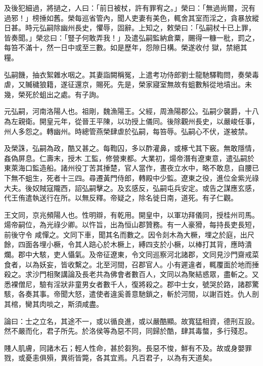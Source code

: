 \begin{pinyinscope}
 及後犯細過，將撾之，人曰：「前日被杖，許有罪宥之。」榮曰：「無過尚爾，況有過邪！」榜捶如舊。榮每巡省管內，聞人吏妻有美色，輒舍其室而淫之，貪暴放縱日甚。時元弘嗣除幽州長史，懼辱，固辭。上知之，敕榮曰：「弘嗣杖十已上罪，皆奏聞。」榮忿曰：「豎子何敢弄我！」及遣弘嗣監納倉粟，颺得一糠一秕，罰之，每笞不滿十，然一日中或至三數。如是歷年，怨隙日構。榮遂收付
 獄，禁絕其糧。



 弘嗣饑，抽衣絮雜水咽之。其妻詣闕稱冤，上遣考功侍郎劉士龍馳驛鞫問，奏榮毒虐，又贓穢狼籍，遂征還京，賜死。先是，榮家寢室無故有蛆數斛從地墳出。未幾，榮死於蛆出之處。有子詢。



 元弘嗣，河南洛陽人也。祖剛，魏漁陽王。父經，周漁陽郡公。弘嗣少襲爵，十八為左親衛。開皇元年，從晉王平陳，以功授上儀同。後除觀州長史，以嚴峻任事，州人多怨之。轉幽州。時總管燕榮肆虐於弘嗣，每笞辱。弘嗣心不伏，遂被禁。



 及榮誅，弘嗣為政，酷又甚之。每鞫囚，多以酢灌鼻，或椓弋其下竅。無敢隱情，姦偽屏息。仁壽末，授木
 工監，修營東都。大業初，煬帝潛有遼東意，遣弘嗣於東萊海口監造船。諸州役丁苦其捶楚，官人當作，晝夜立水中，略不敢息，自腰已下無不蛆生，死者十三四。尋遷黃門侍郎，轉殿中少監。遼東之役，進位金紫光祿大夫。後奴賊寇隴西，詔弘嗣擊之。及玄感反，弘嗣屯兵安定。或告之謀應玄感，代王侑遣執送行在所。以無反釋。帝疑之，除名徙日南，道死。有子仁觀。



 王文同，京兆頻陽人也。性明辯，有乾用。開皇中，以軍功拜儀同，授桂州司馬。煬帝嗣位，為光祿少卿。以忤旨，出為恒山郡贊務。有一人豪猾，每持長吏長短，前後守令
 咸憚之。文同下車，聞其名而數之。因令剡木為大橛，埋之於庭，出尺餘，四面各埋小橛，令其人踣心於木橛上，縛四支於小橛，以棒打其背，應時潰爛。郡中大駭，吏人懾氣。及帝征遼東，令文同巡察河北諸郡，文同見沙門齋戒菜食者，以為妖妄，皆收繫之。北至河間，召郡官人。小有遲違者，輒覆面於地而捶殺之。求沙門相聚講論及長老共為佛會者數百人，文同以為聚結惑眾，盡斬之。又悉裸僧尼，驗有淫狀非童男女者數千人，復將殺之。郡中士女，號哭於路，諸郡驚駭，各奏其事。帝聞大怒，遣使者違奚善意馳鎖之，斬於河間，以謝百姓。仇人剖
 其棺，臠其肉啖之，斯須咸盡。



 論曰：士之立名，其途不一，或以循良進，或以嚴酷顯。故寬猛相資，德刑互設。然不嚴而化，君子所先。於洛侯等為惡不同，同歸於酷，肆其毒螫，多行殘忍。



 賤人肌膚，同諸木石；輕人性命，甚於芻狗。長惡不悛，鮮有不及。故或身嬰罪戮，或憂恚俱殞，異術皆斃，各其宜焉。凡百君子，以為有天道矣。



\end{pinyinscope}